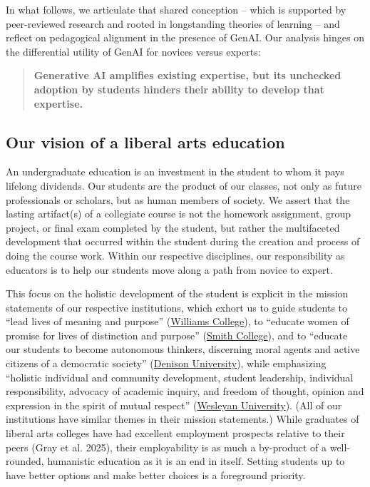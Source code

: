 \documentclass[
]{hdsr}
\begin{document}
In what follows, we articulate that shared conception -- which is
supported by peer-reviewed research and rooted in longstanding theories
of learning -- and reflect on pedagogical alignment in the presence of
GenAI. Our analysis hinges on the differential utility of GenAI for
novices versus experts:

\begin{quote}
\textbf{Generative AI amplifies existing expertise, but its unchecked
adoption by students hinders their ability to develop that expertise.}
\end{quote}

\subsection{Our vision of a liberal arts
education}\label{our-vision-of-a-liberal-arts-education}

An undergraduate education is an investment in the student to whom it
pays lifelong dividends. Our students are the product of our classes,
not only as future professionals or scholars, but as human members of
society. We assert that the lasting artifact(s) of a collegiate course
is not the homework assignment, group project, or final exam completed
by the student, but rather the multifaceted development that occurred
within the student during the creation and process of doing the course
work. Within our respective disciplines, our responsibility as educators
is to help our students move along a path from novice to expert.

This focus on the holistic development of the student is explicit in the
mission statements of our respective institutions, which exhort us to
guide students to ``lead lives of meaning and purpose''
(\href{https://www.williams.edu/about/mission-values/}{Williams
College}), to ``educate women of promise for lives of distinction and
purpose''
(\href{https://www.smith.edu/discover-smith/history-traditions}{Smith
College}), and to ``educate our students to become autonomous thinkers,
discerning moral agents and active citizens of a democratic society''
(\href{https://catalog.denison.edu/catalog/history-mission-values/mission/}{Denison
University}), while emphasizing ``holistic individual and community
development, student leadership, individual responsibility, advocacy of
academic inquiry, and freedom of thought, opinion and expression in the
spirit of mutual respect''
(\href{https://www.wesleyan.edu/reslife/office/Mission\%20Statement1.html}{Wesleyan
University}). (All of our institutions have similar themes in their
mission statements.) While graduates of liberal arts colleges have had
excellent employment prospects relative to their peers (Gray et al.
2025), their employability is as much a by-product of a well-rounded,
humanistic education as it is an end in itself. Setting students up to
have better options and make better choices is a foreground priority.
\end{document}
